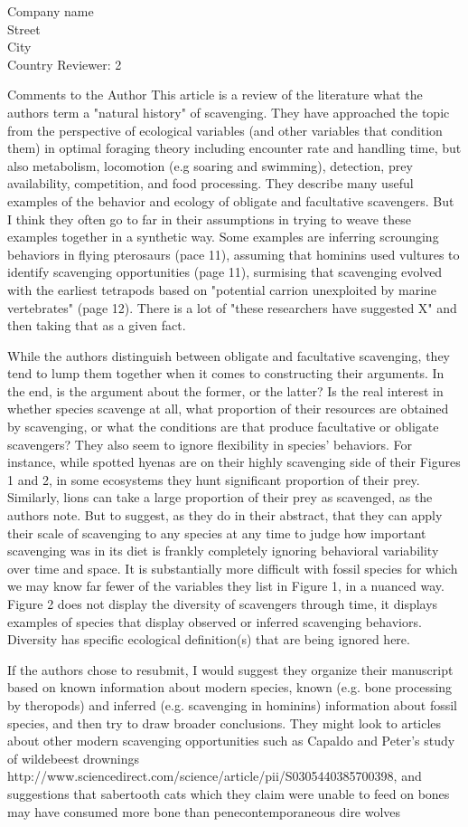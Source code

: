 \documentclass{letter}
\begin{document}
\begin{letter}{Company name \\ Street\\ City\\ Country}
Reviewer: 2

Comments to the Author
This article is a review of the literature what the authors term a "natural history" of scavenging. They have approached the topic from the perspective of ecological variables (and other variables that condition them) in optimal foraging theory including encounter rate and handling time, but also metabolism, locomotion (e.g soaring and swimming), detection, prey availability, competition, and food processing. They describe many useful examples of the behavior and ecology of obligate and facultative scavengers. But I think they often go to far in their assumptions in trying to weave these examples together in a synthetic way. Some examples are inferring scrounging behaviors in flying pterosaurs (pace 11), assuming that hominins used vultures to identify scavenging opportunities (page 11), surmising that scavenging evolved with the earliest tetrapods based on "potential carrion unexploited by marine vertebrates" (page 12). There is a lot of "these researchers have suggested X" and then taking that as a given fact.

While the authors distinguish between obligate and facultative scavenging, they tend to lump them together when it comes to constructing their arguments. In the end, is the argument about the former, or the latter? Is the real interest in whether species scavenge at all, what proportion of their resources are obtained by scavenging, or what the conditions are that produce facultative or obligate scavengers? They also seem to ignore flexibility in species' behaviors. For instance, while spotted hyenas are on their highly scavenging side of their Figures 1 and 2, in some ecosystems they hunt significant proportion of their prey. Similarly, lions can take a large proportion of their prey as scavenged, as the authors note. But to suggest, as they do in their abstract, that they can apply their scale of scavenging to any species at any time to judge how important scavenging was in its diet is frankly completely ignoring behavioral variability over time and space. It is substantially more difficult with fossil species for which we may know far fewer of the variables they list in Figure 1, in a nuanced way. Figure 2 does not display the diversity of scavengers through time, it displays examples of species that display observed or inferred scavenging behaviors. Diversity has specific ecological definition(s) that are being ignored here.

If the authors chose to resubmit, I would suggest they organize their manuscript based on known information about modern species, known (e.g. bone processing by theropods) and inferred (e.g. scavenging in hominins) information about fossil species, and then try to draw broader conclusions. They might look to articles about other modern scavenging opportunities such as Capaldo and Peter's study of wildebeest drownings http://www.sciencedirect.com/science/article/pii/S0305440385700398, and suggestions that sabertooth cats which they claim were unable to feed on bones may have consumed more bone than penecontemporaneous dire wolves 


\end{letter}
\end{document}
